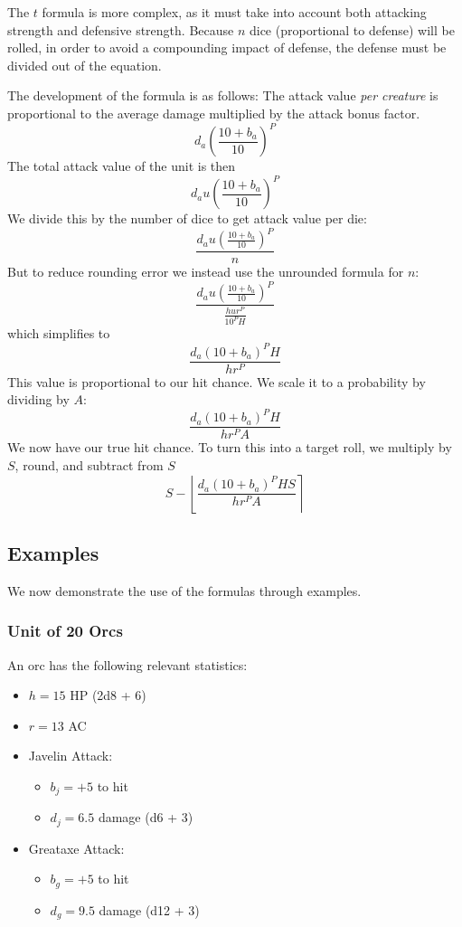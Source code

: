 \documentclass[twocolumn]{article}
\begin{document}
The $t$ formula is more complex,
as it must take into account both attacking strength and defensive strength.
Because $n$ dice (proportional to defense) will be rolled,
in order to avoid a compounding impact of defense,
the defense must be divided out of the equation.

The development of the formula is as follows:
The attack value \emph{per creature} is proportional to
the average damage multiplied by the attack bonus factor.
\[
    d_a \left(\frac{10 + b_{a}}{10}\right)^{P}
\]
The total attack value of the unit is then 
\[
    d_a u \left(\frac{10 + b_{a}}{10}\right)^{P}
\]
We divide this by the number of dice to get attack value per die: 
\[
    \frac
        {d_a u \left(\frac{10 + b_{a}}{10}\right)^{P}}
        {n}
\]
But to reduce rounding error we instead use the unrounded formula for $n$: 
\[
    \frac
        {d_a u \left(\frac{10 + b_{a}}{10}\right)^{P}}
        {\frac{h u r^P}{10^P H}}
\]
which simplifies to 
\[
    \frac
        {d_a (10 + b_{a})^P H}
        {h r^P}
\]
This value is proportional to our hit chance.
We scale it to a probability by dividing by $A$:
\[
    \frac
        {d_a (10 + b_{a})^P H}
        {h r^P A}
\]
We now have our true hit chance.
To turn this into a target roll,
we multiply by $S$, round, and subtract from $S$
\[
    S -
    \left\lfloor
        \frac
            {d_a (10 + b_{a})^P H S}
            {h r^P A}
    \right\rceil
\]

\subsection{Examples}\label{sec:examples}

We now demonstrate the use of the formulas through examples.

\subsubsection{Unit of 20 Orcs}

An orc has the following relevant statistics:
\begin{itemize}
    \item $h = 15$ HP (2d8 + 6)
    \item $r = 13$ AC
    \item Javelin Attack:
        \begin{itemize}
            \item $b_j = +5$ to hit
            \item $d_j = 6.5$ damage (d6 + 3)
        \end{itemize}
    \item Greataxe Attack:
        \begin{itemize}
            \item $b_g = +5$ to hit
            \item $d_g = 9.5$ damage (d12 + 3)
        \end{itemize}
\end{itemize}
\end{document}
